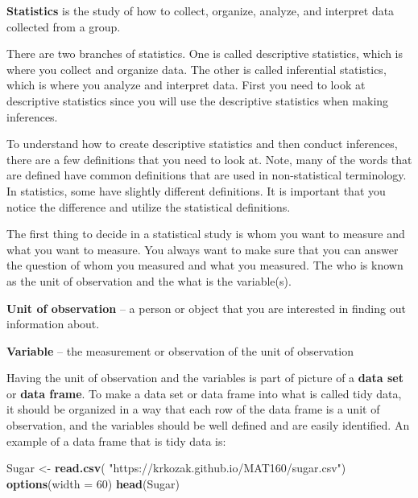 \documentclass[
]{book}
\newenvironment{Shaded}{\begin{snugshade}}{\end{snugshade}}
\newcommand{\DataTypeTok}[1]{\textcolor[rgb]{0.13,0.29,0.53}{#1}}
\newcommand{\DecValTok}[1]{\textcolor[rgb]{0.00,0.00,0.81}{#1}}
\newcommand{\KeywordTok}[1]{\textcolor[rgb]{0.13,0.29,0.53}{\textbf{#1}}}
\newcommand{\NormalTok}[1]{#1}
\newcommand{\StringTok}[1]{\textcolor[rgb]{0.31,0.60,0.02}{#1}}
\begin{document}
\textbf{Statistics} is the study of how to collect, organize, analyze, and interpret data collected from a group.

There are two branches of statistics. One is called descriptive statistics, which is where you collect and organize data. The other is called inferential statistics, which is where you analyze and interpret data. First you need to look at descriptive statistics since you will use the descriptive statistics when making inferences.

To understand how to create descriptive statistics and then conduct inferences, there are a few definitions that you need to look at. Note, many of the words that are defined have common definitions that are used in non-statistical terminology. In statistics, some have slightly different definitions. It is important that you notice the difference and utilize the statistical definitions.

The first thing to decide in a statistical study is whom you want to measure and what you want to measure. You always want to make sure that you can answer the question of whom you measured and what you measured. The who is known as the unit of observation and the what is the variable(s).

\textbf{Unit of observation} -- a person or object that you are interested in finding out information about.

\textbf{Variable} -- the measurement or observation of the unit of observation

Having the unit of observation and the variables is part of picture of a \textbf{data set} or \textbf{data frame}. To make a data set or data frame into what is called tidy data, it should be organized in a way that each row of the data frame is a unit of observation, and the variables should be well defined and are easily identified. An example of a data frame that is tidy data is:

\begin{Shaded}
\begin{Highlighting}[]
\NormalTok{Sugar <-}\StringTok{ }\KeywordTok{read.csv}\NormalTok{(}
        \StringTok{"https://krkozak.github.io/MAT160/sugar.csv"}\NormalTok{)}
\KeywordTok{options}\NormalTok{(}\DataTypeTok{width =} \DecValTok{60}\NormalTok{)}
\KeywordTok{head}\NormalTok{(Sugar) }
\end{Highlighting}
\end{Shaded}
\end{document}
